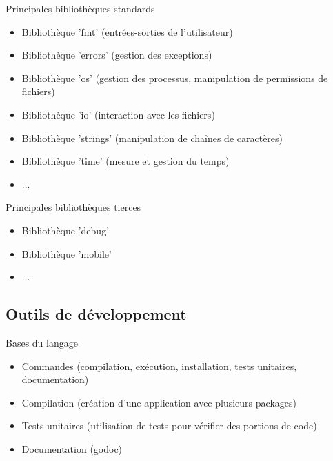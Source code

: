 \documentclass{beamer}
\begin{document}
\begin{frame}
\begin{block}{Principales bibliothèques standards} 
	\begin{itemize}
		[circle]
		\item Bibliothèque 'fmt' (entrées-sorties de l'utilisateur)
		\item Bibliothèque 'errors' (gestion des exceptions)
		\item Bibliothèque 'os' (gestion des processus, manipulation de permissions de fichiers)
		\item Bibliothèque 'io' (interaction avec les fichiers)
		\item Bibliothèque 'strings' (manipulation de chaînes de caractères)
		\item Bibliothèque 'time' (mesure et gestion du temps)
		\item ...
	\end{itemize}
\end{block}

\begin{block}{Principales bibliothèques tierces} 
	\begin{itemize}
		[circle]
		\item Bibliothèque 'debug'
		\item Bibliothèque 'mobile'
		\item ...
	\end{itemize}
\end{block}
\end{frame}

\subsection{Outils de développement}

\begin{frame}
\begin{block}{Bases du langage} 
	\begin{itemize}
		[circle]
		\item Commandes (compilation, exécution, installation, tests unitaires, documentation)
		\item Compilation (création d'une application avec plusieurs packages)
		\item Tests unitaires (utilisation de tests pour vérifier des portions de code)
		\item Documentation (godoc)
		
	\end{itemize}
\end{block}
\end{frame}
\end{document}
